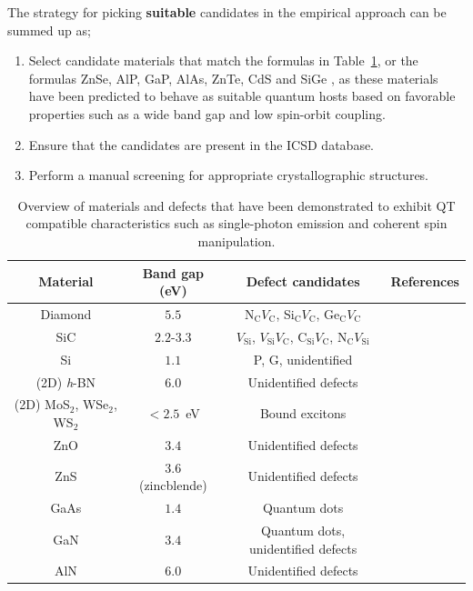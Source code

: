 \documentclass[superscriptaddress,unsortedaddress,
 amsmath,amssymb,
 aps,
]{revtex4-2}
\begin{document}
The strategy for picking \textbf{suitable} candidates in the empirical approach can be summed up as;  
\begin{enumerate}
    \item Select candidate materials that match the formulas in  Table~\ref{tab:qt-materials}, or the formulas ZnSe, AlP, GaP, AlAs, ZnTe, CdS \cite{Weber2010} and SiGe \cite{Hardy2019}, as these materials have been predicted to behave as suitable quantum hosts based on favorable properties such as a wide band gap and low spin-orbit coupling.  
    \item Ensure that the candidates are present in the ICSD database.  
    \item Perform a manual screening for appropriate crystallographic structures. 
\end{enumerate}

\begin{table}[b]
    \centering 
    \caption{Overview of materials and defects that have been demonstrated to exhibit QT compatible characteristics such as single-photon emission and coherent spin manipulation.}
    \begin{tabular}{c|c|c|c}
    Material & Band gap (eV) & Defect candidates & References \\
    \hline
    Diamond  & $5.5$  & N$_\mathrm{C}V_\mathrm{C}$, Si$_\mathrm{C}V_\mathrm{C}$, Ge$_\mathrm{C}V_\mathrm{C}$ & \cite{Taylor2008,Balasubramanian_2009,Barclay2011,Gordon2013,Rogers_2014,Bhaskar_2018} \\ 
    SiC & $2.2$-$3.3$ & $V_\mathrm{Si}$, $V_\mathrm{Si}V_\mathrm{C}$, C$_\mathrm{Si}V_\mathrm{C}$, N$_\mathrm{C}V_\mathrm{Si}$ & \cite{Widmann2014,Christle_2015,Castelletto_2014,Zargaleh_2018}  \cite{Weber2010, Son2020, Falk2013} \\ 
    Si & $1.1$ & P, G, unidentified & \cite{Muhonen_2014,Durand_2020,Redjem2020} \\ 
    (2D) \textit{h}-BN & $6.0$ & Unidentified defects & \cite{Tran_2016,Tran_2016b,Hayee_2020} \\ 
    (2D) MoS$_2$, WSe$_2$, WS$_2$ & $<2.5$~eV & Bound excitons & \cite{Toth2019} \\
    ZnO & $3.4$ & Unidentified defects & \cite{Morfa2012} \\ 
    ZnS & $3.6$ (zincblende) & Unidentified defects & \cite{Stewart2019} \\ 
    GaAs & $1.4$ & Quantum dots & \cite{Bluhm2010} \\ 
    GaN & $3.4$ & Quantum dots, unidentified defects & \cite{Roux2017,Berhane2018} \\
    AlN & $6.0$ & Unidentified defects & \cite{Xue2020}\\
    \end{tabular}
    \label{tab:qt-materials}
\end{table} 
\end{document}
